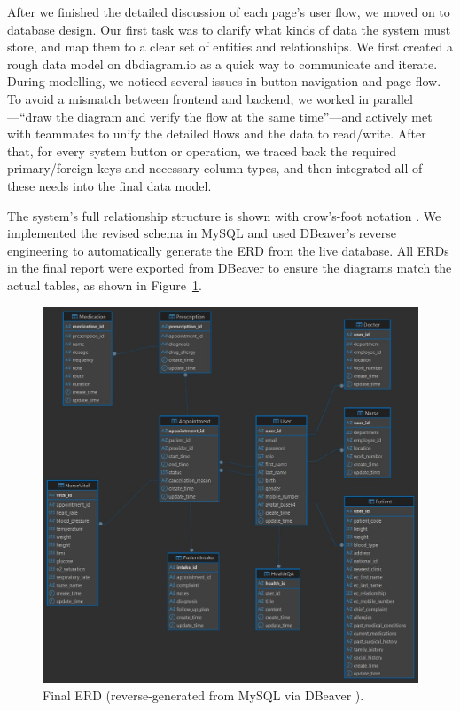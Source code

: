 %

After we finished the detailed discussion of each page’s user flow, we moved on to database design. Our first task was to clarify what kinds of data the system must store, and map them to a clear set of entities and relationships. We first created a rough data model on dbdiagram.io \citep{dbmldocs} as a quick way to communicate and iterate. During modelling, we noticed several issues in button navigation and page flow. To avoid a mismatch between frontend and backend, we worked in parallel—“draw the diagram and verify the flow at the same time”—and actively met with teammates to unify the detailed flows and the data to read/write. After that, for every system button or operation, we traced back the required primary/foreign keys and necessary column types, and then integrated all of these needs into the final data model.




The system’s full relationship structure is shown with crow’s-foot notation \citep{crowsfoot}. We implemented the revised schema in MySQL and used DBeaver’s reverse engineering \citep{dbeaverERD} to automatically generate the ERD from the live database. All ERDs in the final report were exported from DBeaver to ensure the diagrams match the actual tables, as shown in Figure~\ref{fig:final_erd}.

\begin{figure}[!htbp]
  \centering
  \includegraphics[width=\linewidth]{../../images/ERD.jpeg}
  \caption{Final ERD (reverse-generated from MySQL via DBeaver \protect\citep{dbeaverERD}).}
  \label{fig:final_erd}
\end{figure}
\FloatBarrier

